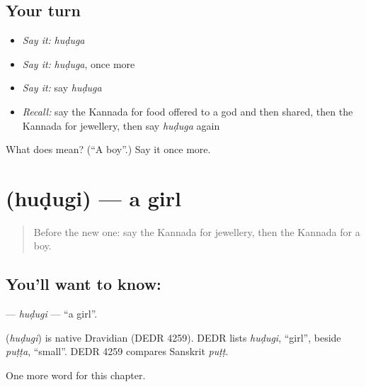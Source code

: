 \subsection*{Your turn}
\begin{itemize}
\raggedright
  \item \emph{Say it:} \emph{huḍuga}
  \item \emph{Say it:} \emph{huḍuga}, once more
  \item \emph{Say it:} say \emph{huḍuga}
  \item \emph{Recall:} say the Kannada for food offered to a god and then shared, then the Kannada for jewellery, then say \emph{huḍuga} again
\end{itemize}

\begin{tcolorbox}[breakable,colback=teal!4,colframe=teal!35!black,title={Before you move on}]
What does  mean? (\textquotedblleft{}A boy\textquotedblright{}.) Say it once more.
\end{tcolorbox}
\section[\texorpdfstring{\kn{ಹುಡುಗಿ} (huḍugi)}{ಹುಡುಗಿ (huḍugi)}]{ (huḍugi) — a girl}

\label{lesson:KA-C263-hudugi}



\begin{quote}
Before the new one: say the Kannada for jewellery, then the Kannada for a boy.
\end{quote}

\subsection*{You'll want to know: }
\textbf{} — \emph{huḍugi} — \textquotedblleft{}a girl\textquotedblright{}.

\begin{cousinweb}
\textbf{} (\emph{huḍugi}) is native Dravidian (DEDR 4259). DEDR lists \emph{huḍugi}, \textquotedblleft{}girl\textquotedblright{}, beside \emph{puṭṭa}, \textquotedblleft{}small\textquotedblright{}. DEDR 4259 compares Sanskrit \emph{puṭṭ}.
\end{cousinweb}

\begin{grammarlens}[title={What you've built}]
One more word for this chapter.
\end{grammarlens}

